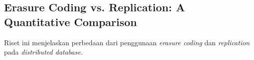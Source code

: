 \subsection{Erasure Coding vs. Replication: A Quantitative Comparison}

Riset ini menjelaskan perbedaan dari penggunaan \textit{erasure coding} dan \textit{replication} pada \textit{distributed database}.